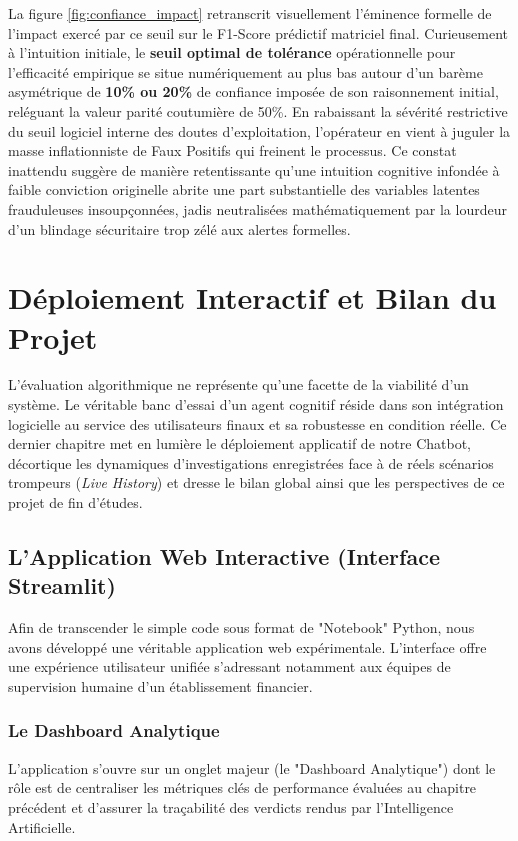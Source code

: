 \documentclass[12pt, a4paper, twoside]{report}
\begin{document}
La figure \ref{fig:confiance_impact} retranscrit visuellement l'éminence formelle de l'impact exercé par ce seuil sur le F1-Score prédictif matriciel final.
Curieusement à l'intuition initiale, le \textbf{seuil optimal de tolérance} opérationnelle pour l’efficacité empirique se situe numériquement au plus bas autour d'un barème asymétrique de \textbf{10\% ou 20\%} de confiance imposée de son raisonnement initial, reléguant la valeur parité coutumière de 50\%.
En rabaissant la sévérité restrictive du seuil logiciel interne des doutes d'exploitation, l'opérateur en vient à juguler la masse inflationniste de Faux Positifs qui freinent le processus.
Ce constat inattendu suggère de manière retentissante qu'une intuition cognitive infondée à faible conviction originelle abrite une part substantielle des variables latentes frauduleuses insoupçonnées, jadis neutralisées mathématiquement par la lourdeur d'un blindage sécuritaire trop zélé aux alertes formelles.

\chapter{Déploiement Interactif et Bilan du Projet}

L'évaluation algorithmique ne représente qu'une facette de la viabilité d'un système. Le véritable banc d'essai d'un agent cognitif réside dans son intégration logicielle au service des utilisateurs finaux et sa robustesse en condition réelle. Ce dernier chapitre met en lumière le déploiement applicatif de notre Chatbot, décortique les dynamiques d'investigations enregistrées face à de réels scénarios trompeurs (\textit{Live History}) et dresse le bilan global ainsi que les perspectives de ce projet de fin d'études.

\section{L'Application Web Interactive (Interface Streamlit)}

Afin de transcender le simple code sous format de "Notebook" Python, nous avons développé une véritable application web expérimentale. L'interface offre une expérience utilisateur unifiée s'adressant notamment aux équipes de supervision humaine d'un établissement financier.

\subsection{Le Dashboard Analytique}
L'application s'ouvre sur un onglet majeur (le "Dashboard Analytique") dont le rôle est de centraliser les métriques clés de performance évaluées au chapitre précédent et d'assurer la traçabilité des verdicts rendus par l'Intelligence Artificielle.
\end{document}
